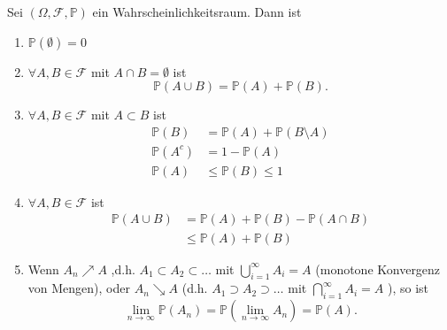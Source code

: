 \begin{lemma}\label{lm:weitere-eigenschaften-eines-wahrscheinlichkeitsraums}
    Sei $(\Omega, \mathcal{F}, \mathbb{P})$ ein Wahrscheinlichkeitsraum. Dann ist
\begin{enumerate}[label=\protect\circled{\alph*}]
    \item $\mathbb{P}(\emptyset)=0$ 
    \item $\forall A,B\in \mathcal{F}$ mit $A\cap B = \emptyset$ ist
        \[
            \mathbb{P}(A\cup B ) = \mathbb{P}(A) + \mathbb{P}(B)
        .\] 
    \item      $\forall A,B\in \mathcal{F}$ mit $A\subset B$ ist 
        \begin{equation*}
            \begin{split}
                \mathbb{P}(B) &= \mathbb{P}(A) + \mathbb{P}(B \setminus A)  \\
                \mathbb{P}(A^{c}) &= 1 - \mathbb{P}(A) \\
                \mathbb{P}(A) &\leq  \mathbb{P}(B) \leq  1
            \end{split}
        \end{equation*}
    \item $\forall A,B \in \mathcal{F}$ ist
        \begin{equation*}
            \begin{split}
                \mathbb{P}(A \cup B) &= \mathbb{P}(A) + \mathbb{P}(B) - \mathbb{P}(A\cap B) \\
                                     &\leq  \mathbb{P}(A) + \mathbb{P}(B)
            \end{split}
        \end{equation*}
    \item Wenn $A_n \nearrow A$ ,d.h. $A_1\subset A_2\subset \ldots$ mit $\bigcup_{i =1}^{\infty} A_i = A$ (monotone Konvergenz von Mengen), oder $A_n \searrow A$ (d.h.  $A_1\supset A_2 \supset \ldots$ mit $\bigcap_{i=1}^{\infty} A_i = A $ ), so ist
        \[
            \lim_{n \to \infty} \mathbb{P}(A_n) = \mathbb{P}\left( \lim_{n \to \infty} A_n \right)  = \mathbb{P}(A)
        .\] 
\end{enumerate}
\end{lemma}
